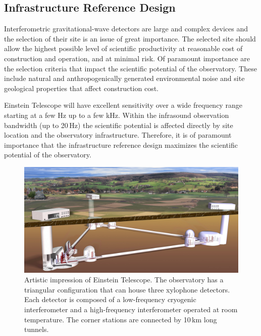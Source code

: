 \subsection{Infrastructure Reference Design}
\label{Sec:infraref}
Interferometric gravitational-wave detectors are large and complex devices and the selection of their site is an issue of great importance. The selected site should allow the highest possible level of scientific productivity at reasonable cost of construction and operation, and at minimal risk. Of paramount importance are the selection criteria that impact the scientific potential of the observatory. These include natural and anthropogenically generated environmental noise and site geological properties that affect construction cost.

Einstein Telescope will have excellent sensitivity over a wide frequency range starting at a few Hz up to a few kHz. Within the infrasound observation bandwidth (up to 20\,Hz) the scientific potential is affected directly by site location and the observatory infrastructure. Therefore, it is of paramount importance that the infrastructure reference design maximizes the scientific potential of the observatory. 
\begin{figure}[h!]
	\centering
		\includegraphics[width=\textwidth]{SiteInfra/SiteInfraFigures/ArtisticView2.jpg}
		\caption{Artistic impression of Einstein Telescope. The observatory has a triangular configuration that can house three xylophone detectors. Each detector is composed of a low-frequency cryogenic interferometer and a high-frequency interferometer operated at room temperature. The corner stations are connected by 10\,km long tunnels.}
		\label{Landscape}
\end{figure}

